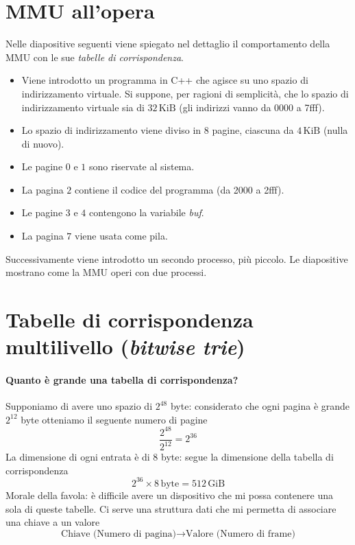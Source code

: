 \section{MMU all'opera}
\small
Nelle diapositive seguenti viene spiegato nel dettaglio il comportamento della MMU con le sue \emph{tabelle di corrispondenza}. 
\begin{itemize}
	\item Viene introdotto un programma in C++ che agisce su uno spazio di indirizzamento virtuale. Si suppone, per ragioni di semplicità, che lo spazio di indirizzamento virtuale sia di $32\,\text{KiB}$ (gli indirizzi vanno da 0000 a 7fff).
	\item Lo spazio di indirizzamento viene diviso in 8 pagine, ciascuna da $4\,\text{KiB}$ (nulla di nuovo).
	\item Le pagine $0$ e $1$ sono riservate al sistema.
	\item La pagina $2$ contiene il codice del programma (da 2000 a 2fff).
	\item Le pagine $3$ e $4$ contengono la variabile \emph{buf}.
	\item La pagina $7$ viene usata come pila.
\end{itemize}
Successivamente viene introdotto un secondo processo, più piccolo. Le diapositive mostrano come la MMU operi con due processi.
\normalsize 



\section{Tabelle di corrispondenza multilivello (\emph{bitwise trie})}
\paragraph{Quanto è grande una tabella di corrispondenza?} Supponiamo di avere uno spazio di $2^{48}$ byte: considerato che ogni pagina è grande $2^{12}$ byte otteniamo il seguente numero di pagine
\[\frac{2^{48}}{2^{12}}=2^{36}\]
La dimensione di ogni entrata è di 8 byte: segue la dimensione della tabella di corrispondenza
\[2^{36} \times 8\,\text{byte}=512\,\text{GiB}\]
Morale della favola: è difficile avere un dispositivo che mi possa contenere una sola di queste tabelle. Ci serve una struttura dati che mi permetta di associare una chiave a un valore
\[\boxed{\text{Chiave (Numero di pagina)} \longrightarrow \text{Valore (Numero di frame)}}\]
